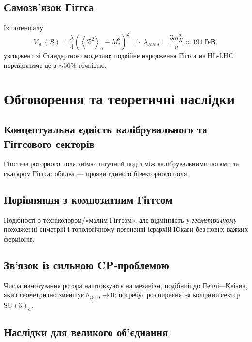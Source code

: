 \documentclass[11pt,a4paper]{article}
\newcommand{\grade}[2]{\left\langle #1 \right\rangle_{#2}}
\newcommand{\scal}[1]{\grade{#1}{0}}
\newcommand{\Biv}{\mathcal{B}}
\newcommand{\SU}{\mathrm{SU}}
\theoremstyle{definition}
\theoremstyle{plain}
\theoremstyle{remark}
\begin{document}
\subsection{Самозв’язок Гіггса}

Із потенціалу
\begin{equation}
  V_{\text{eff}}(\Biv) = \frac{\lambda}{4}(\scal{\Biv^2}-M_\ast^2)^2
  \;\Rightarrow\;
  \lambda_{HHH} = \frac{3m_H^2}{v} \approx 191~\text{ГеВ},
\end{equation}
узгоджено зі Стандартною моделлю; подвійне народження Гіггса на HL-LHC перевірятиме це з $\sim 50\%$ точністю.

\vspace{1em}

\section{Обговорення та теоретичні наслідки}\label{sec:discussion}

\subsection{Концептуальна єдність калібрувального та Гіггсового секторів}

Гіпотеза роторного поля знімає штучний поділ між калібрувальними полями та скаляром Гіггса: обидва — прояви єдиного бівекторного поля.

\subsection{Порівняння з композитним Гіггсом}

Подібності з техніколором/«малим Гіггсом», але відмінність у \emph{геометричному} походженні симетрій і топологічному поясненні ієрархій Юкави без нових важких ферміонів.

\subsection{Зв’язок із сильною CP-проблемою}

Числа намотування ротора наштовхують на механізм, подібний до Печчі—Квінна, який геометрично зменшує $\theta_{\text{QCD}}\to 0$; потребує розширення на колірний сектор $\SU(3)_C$.

\subsection{Наслідки для великого об’єднання}
\end{document}
